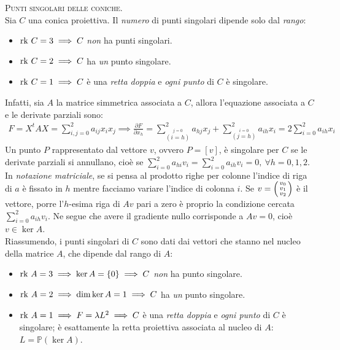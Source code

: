 \begin{observe} \textsc{Punti singolari delle coniche.}\\
	Sia $C$ una conica proiettiva. Il \textit{numero} di punti singolari dipende solo dal \textit{rango}:
		\begin{itemize}
			\item	$\mathrm{rk}\  C=3\implies C$ \textit{non} ha punti singolari.
			\item	$\mathrm{rk}\  C=2 \implies C$ ha \textit{un} punto singolare.
			\item	$\mathrm{rk}\  C=1 \implies C$ è una \textit{retta doppia} e \textit{ogni punto} di $C$ è singolare.
		\end{itemize}
	Infatti, sia $A$ la matrice simmetrica associata a $C$, allora l'equazione associata a $C$ e le derivate parziali sono:
		\begin{gather*}
			F=X^tAX=\sum_{i,j=0}^2 a_{ij}x_ix_j \implies \frac{\partial{F}}{\partial{x_h}} = \sum_{\stackrel{j=0}{\left(i=h\right)}}^2 a_{hj}x_j+ \sum_{\stackrel{i=0}{\left(j=h\right)}}^2  a_{ih}x_i = 2\sum_{i=0}^2 a_{ih}x_i
		\end{gather*}
	Un punto $P$ rappresentato dal vettore $v$, ovvero $P=[v]$, è singolare per $C$ se le derivate parziali si annullano, cioè se $\displaystyle\sum_{i=0}^2 a_{hi}v_i=\sum_{i=0}^2 a_{ih}v_i=0,\ \forall h=0,1,2$. In \textit{notazione matriciale}, se si pensa al prodotto righe per colonne l'indice di riga di $a$ è fissato in $h$ mentre facciamo variare l'indice di colonna $i$. Se $v=\begin{psmallmatrix} v_0 \\ v_1 \\ v_2 \end{psmallmatrix}$ è il vettore, porre l'$h$-esima riga di $Av$ pari a zero è proprio la condizione cercata $\displaystyle\sum_{i=0}^2 a_{ih}v_i$. Ne segue che avere il gradiente nullo corrisponde a $Av=0$, cioè $v\in\ker A$.\\
	Riassumendo, i punti singolari di $C$ sono dati dai vettori che stanno nel nucleo della matrice $A$, che dipende dal rango di $A$:
		\begin{itemize}
			\item	$\mathrm{rk}\  A=3\implies \ker A=\{0 \} \implies C$ \textit{non} ha punto singolare.
			\item	$\mathrm{rk}\  A=2\implies \dim\ker A=1 \implies C$ ha \textit{un} punto singolare.
			\item	$\mathrm{rk}\  A=1\implies F=\lambda L^2 \implies C$ è una \textit{retta doppia} e \textit{ogni punto} di $C$ è singolare; è esattamente la retta proiettiva associata al nucleo di $A$: $L=\mathbb{P}(\ker A)$.

\end{itemize}
\end{observe}
